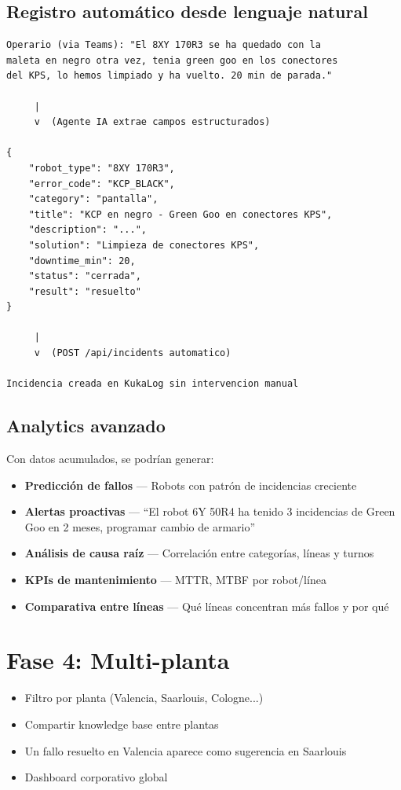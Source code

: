 \documentclass[11pt,a4paper]{article}
\begin{document}
\subsection{Registro automático desde lenguaje natural}

\begin{lstlisting}
Operario (via Teams): "El 8XY 170R3 se ha quedado con la
maleta en negro otra vez, tenia green goo en los conectores
del KPS, lo hemos limpiado y ha vuelto. 20 min de parada."

     |
     v  (Agente IA extrae campos estructurados)

{
    "robot_type": "8XY 170R3",
    "error_code": "KCP_BLACK",
    "category": "pantalla",
    "title": "KCP en negro - Green Goo en conectores KPS",
    "description": "...",
    "solution": "Limpieza de conectores KPS",
    "downtime_min": 20,
    "status": "cerrada",
    "result": "resuelto"
}

     |
     v  (POST /api/incidents automatico)

Incidencia creada en KukaLog sin intervencion manual
\end{lstlisting}

\subsection{Analytics avanzado}

Con datos acumulados, se podrían generar:
\begin{itemize}[noitemsep]
    \item \textbf{Predicción de fallos} --- Robots con patrón de incidencias creciente
    \item \textbf{Alertas proactivas} --- ``El robot 6Y 50R4 ha tenido 3 incidencias de Green Goo en 2 meses, programar cambio de armario''
    \item \textbf{Análisis de causa raíz} --- Correlación entre categorías, líneas y turnos
    \item \textbf{KPIs de mantenimiento} --- MTTR, MTBF por robot/línea
    \item \textbf{Comparativa entre líneas} --- Qué líneas concentran más fallos y por qué
\end{itemize}

\section{Fase 4: Multi-planta}

\begin{itemize}[noitemsep]
    \item Filtro por planta (Valencia, Saarlouis, Cologne...)
    \item Compartir knowledge base entre plantas
    \item Un fallo resuelto en Valencia aparece como sugerencia en Saarlouis
    \item Dashboard corporativo global
\end{itemize}
\end{document}
